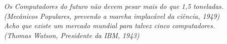 
\begin{epigrafe}
  \vspace*{\fill}
  \begin{flushright}
    \textit{Os Computadores do futuro não devem pesar mais do que 1,5 toneladas. \\
           (Mecânicos Populares, prevendo a marcha implacável da ciência, 1949) \\
           Acho que existe um mercado mundial para talvez cinco computadores. \\
           (Thomas Watson, Presidente da IBM, 1943)}
  \end{flushright}
\end{epigrafe}

\cleardoublepage

